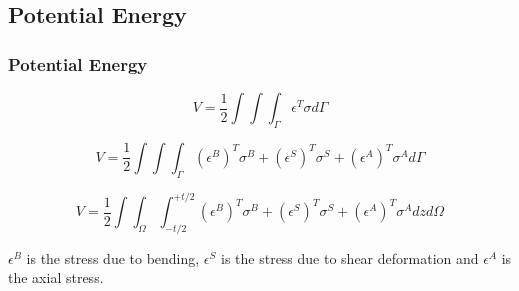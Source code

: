 \documentclass[9pt]{beamer}
\begin{document}
\subsection{Potential Energy}
\begin{frame}
\frametitle {Potential Energy}

\begin{equation*}
V=\frac{1}{2}\int\int\int_\Gamma \epsilon^T \sigma  d \Gamma
\end{equation*}

\begin{equation*}
V=\frac{1}{2}\int\int\int_\Gamma \left(\epsilon^B\right)^T \sigma^B + \left(\epsilon^S\right)^T \sigma^S + \left(\epsilon^A\right)^T \sigma^A d \Gamma
\end{equation*}

\begin{equation*}
V=\frac{1}{2}\int\int_\Omega \int_{-t/2}^{+t/2} \left(\epsilon^B\right)^T \sigma^B + \left(\epsilon^S\right)^T \sigma^S + \left(\epsilon^A\right)^T \sigma^A dz d \Omega
\end{equation*}

$\epsilon^B$ is the stress due to bending, $\epsilon^S$ is the stress due to shear deformation and  $\epsilon^A$ is the axial stress.

\end{frame}
\end{document}
